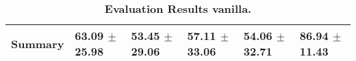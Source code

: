 \begin{table}[htb]
{\begin{tabular}{llllll}
\midrule
\textbf{Summary                                  } &                  \phantom{0}63.09 $\pm$ 25.98 &                      \phantom{0}53.45 $\pm$ 29.06 &                  \phantom{0}57.11 $\pm$ 33.06 &                  \phantom{0}54.06 $\pm$ 32.71 &            \phantom{0}86.94 $\pm$ 11.43 \\
\bottomrule
\end{tabular}%
}
\caption{\textbf{Evaluation Results vanilla.}}
\label{tab:eval-results}
\end{table}


